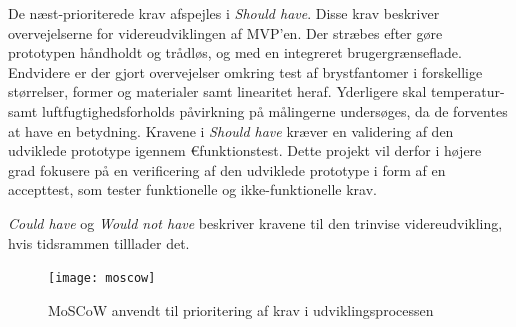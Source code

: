 De næst-prioriterede krav afspejles i \textit{Should have}. Disse krav beskriver overvejelserne for videreudviklingen af MVP'en. Der stræbes efter gøre prototypen håndholdt og trådløs, og med en integreret  brugergrænseflade. Endvidere er der gjort overvejelser omkring test af brystfantomer i forskellige størrelser, former og materialer samt linearitet heraf. Yderligere skal temperatur- samt luftfugtighedsforholds påvirkning på målingerne undersøges, da de forventes at have en  betydning. 
Kravene i \textit{Should have} kræver en validering af den udviklede prototype igennem €funktionstest. Dette projekt vil derfor i højere grad fokusere på en verificering af den udviklede prototype i form af en accepttest, som tester funktionelle og ikke-funktionelle krav. 

\textit{Could have} og \textit{Would not have} beskriver kravene til den trinvise videreudvikling, hvis tidsrammen tilllader det. 

\begin{figure}[]
\texttt{[image: moscow]}
\caption{MoSCoW anvendt til prioritering af krav i udviklingsprocessen}
\label{fig:moscow}
\end{figure}


